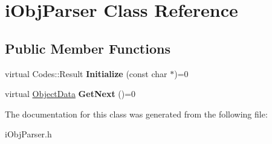 \hypertarget{classiObjParser}{
\section{iObjParser Class Reference}
\label{classiObjParser}
}
\subsection*{Public Member Functions}
\begin{DoxyCompactItemize}
\item 
\hypertarget{classiObjParser_a1d22273d8d83454547a650c0053619d3}{
virtual Codes::Result {\bfseries Initialize} (const char $\ast$)=0}
\label{classiObjParser_a1d22273d8d83454547a650c0053619d3}

\item 
\hypertarget{classiObjParser_aeb9af4a40a06e755d8b0e493526d82dd}{
virtual \hyperlink{structObjectData}{ObjectData} {\bfseries GetNext} ()=0}
\label{classiObjParser_aeb9af4a40a06e755d8b0e493526d82dd}

\end{DoxyCompactItemize}


The documentation for this class was generated from the following file:\begin{DoxyCompactItemize}
\item 
iObjParser.h\end{DoxyCompactItemize}
